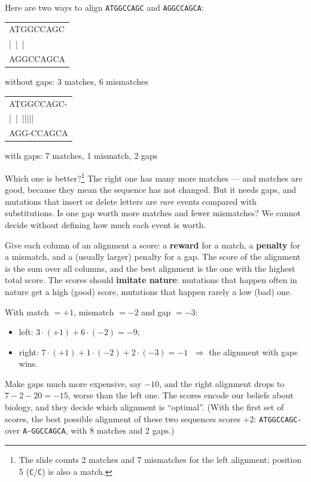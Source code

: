 \documentclass[11pt, oneside]{book}
\makeatletter
\newcommand{\seq}[1]{\texttt{#1}}
\newcommand{\alnblock}[1]{%
  \par\smallskip
  {\centering\ttfamily\small
   \begin{tabular}{@{}l@{}}#1\end{tabular}\par}%
  \smallskip}
\makeatother
\begin{document}
Here are two ways to align \seq{ATGGCCAGC} and \seq{AGGCCAGCA}:

\noindent
\begin{minipage}[t]{0.48\linewidth}
\alnblock{%
ATGGCCAGC\\
|~|~|~~~~\\
AGGCCAGCA}
\centering\small without gaps: 3 matches, 6 mismatches
\end{minipage}\hfill
\begin{minipage}[t]{0.48\linewidth}
\alnblock{%
ATGGCCAGC-\\
|~|~|||||~\\
AGG-CCAGCA}
\centering\small with gaps: 7 matches, 1 mismatch, 2 gaps
\end{minipage}
\medskip

Which one is better?\footnote{The slide counts 2 matches and 7 mismatches for
the left alignment; position 5 (\seq{C}/\seq{C}) is also a match.} The right
one has many more matches --- and matches are good, because they mean the
sequence has not changed. But it needs gaps, and mutations that insert or
delete letters are \emph{rare} events compared with substitutions. Is one gap
worth more matches and fewer mismatches? We cannot decide without defining
how much each event is worth.

\begin{thmbox}[title={The idea of scoring}]
Give each column of an alignment a score: a \textbf{reward} for a match, a
\textbf{penalty} for a mismatch, and a (usually larger) penalty for a gap. The
score of the alignment is the sum over all columns, and the best alignment is
the one with the highest total score. The scores should \textbf{imitate
nature}: mutations that happen often in nature get a high (good) score,
mutations that happen rarely a low (bad) one.
\end{thmbox}

\begin{exbox}[title={The answer depends on the scores}]
With match $= +1$, mismatch $= -2$ and gap $= -3$:
\begin{itemize}
  \item left: $3 \cdot (+1) + 6 \cdot (-2) = -9$;
  \item right: $7 \cdot (+1) + 1 \cdot (-2) + 2 \cdot (-3) = -1$ $\;\Rightarrow$
    the alignment with gaps wins.
\end{itemize}
Make gaps much more expensive, say $-10$, and the right alignment drops to
$7 - 2 - 20 = -15$, worse than the left one. The scores encode our beliefs
about biology, and they decide which alignment is ``optimal''. (With the
first set of scores, the best possible alignment of these two sequences
scores $+2$: \seq{ATGGCCAGC-} over \seq{A-GGCCAGCA}, with 8 matches and 2
gaps.)
\end{exbox}
\end{document}
